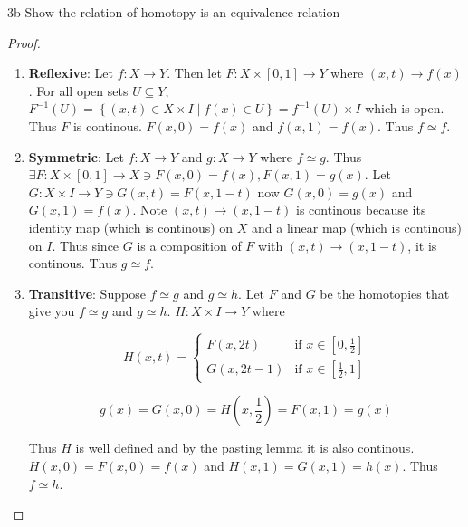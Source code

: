\documentclass{article}
\newcommand*{\subeq}{\subseteq}
\begin{document}
\begin{claim}{3b}\label{Claim 3b.}
    Show the relation of homotopy is an equivalence relation
\end{claim}
\begin{proof}
    \begin{enumerate}
        \item \textbf{Reflexive}: Let $f: X \to Y$. Then let $F: X \times [0 ,1] \to Y$ where $(x, t) \to f(x)$. For all open sets $U \subeq Y$, $F^{-1}(U) = \left\{ (x, t) \in X \times I \mid f(x) \in U \right\} = f^{-1}(U) \times I$ which is open. Thus $F$ is continous. $F(x, 0) = f(x)$ and $f(x, 1) = f(x)$. Thus $f \simeq f$. 
        \item \textbf{Symmetric}: Let $f: X \to Y$ and $g: X \to Y$ where $f \simeq g$. Thus $\exists F: X \times [0, 1] \to X \ni F(x, 0) = f(x), F(x, 1) = g(x)$. Let $G: X \times I \to Y \ni G(x, t) = F(x, 1 - t)$ now $G(x, 0) = g(x)$ and $G(x, 1) = f(x)$. Note $(x, t) \to (x, 1-t)$ is continous because its identity map (which is continous) on $X$ and a linear map (which is continous) on $I$. Thus since $G$ is a composition of $F$ with $(x, t) \to (x, 1-t)$, it is continous. Thus $g \simeq f$. 
        \item \textbf{Transitive}: Suppose $f \simeq g$ and $g \simeq h$. Let $F$ and $G$ be the homotopies that give you $f \simeq g$ and $g \simeq h$. $H: X \times I \to Y$ where 
        
        \begin{equation*}
            H(x, t) = \begin{cases*}
                F(x, 2t) & \text{if $x \in [0, \frac{1}{2}]$} \\
                G(x, 2t - 1) & \text{if $x \in [\frac{1}{2}, 1]$}
            \end{cases*}
        \end{equation*}

        \[g(x) = G(x, 0) = H\left(x, \frac{1}{2}\right) = F(x, 1) = g(x) \]
        
        Thus $H$ is well defined and by the pasting lemma it is also continous. $H(x, 0) = F(x, 0) = f(x)$ and $H(x, 1) = G(x, 1) = h(x)$. Thus $f \simeq h$.     
    \end{enumerate}
\end{proof}
\end{document}
